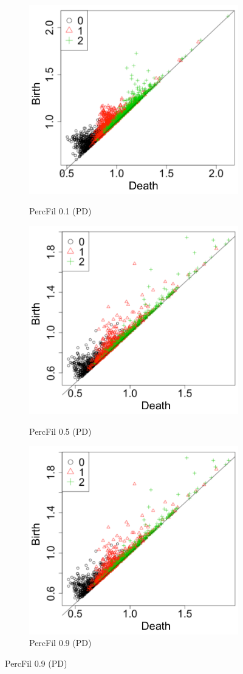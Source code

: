 \documentclass[12pt]{article}
\begin{document}
\begin{center}
\begin{figure}[htp!]
\begin{subfigure}{.32\textwidth}
      \label{fig:percfil09voronoi}
    \end{subfigure}
      \begin{subfigure}{.32\textwidth}
      \centering
      \caption{PercFil 0.1 (PD)}  \includegraphics[width=0.6\linewidth]{percfil01pd.pdf}
      \label{fig:percfil01pd}
    \end{subfigure}
      \begin{subfigure}{.32\textwidth}
      \centering
      \caption{PercFil 0.5 (PD)}  \includegraphics[width=0.6\linewidth]{percfil09pd.pdf}
      \label{fig:percfil09pd}
    \end{subfigure}
      \begin{subfigure}{.32\textwidth}
      \centering
      \caption{PercFil 0.9 (PD)}  \includegraphics[width=0.6\linewidth]{percfil09pd.pdf}

\end{subfigure}
\end{figure}
\end{center}
\end{document}

